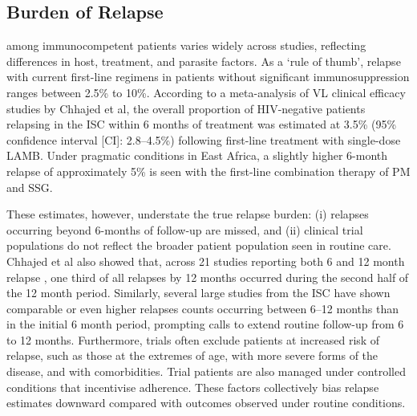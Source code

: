 
\subsection{Burden of Relapse\label{sec:burden-relapse}}

 among immunocompetent patients varies widely across studies, reflecting differences in host, treatment, and parasite factors\cite{chhajed2024}. As a `rule of thumb', relapse  with current first-line regimens in patients without significant immunosuppression ranges between 2.5\% to 10\%\cite{chhajed2024}. According to a meta-analysis of VL clinical efficacy studies by Chhajed et al, the overall proportion of HIV-negative patients relapsing in the ISC within 6 months of treatment was estimated at 3.5\% (95\% confidence interval [CI]: 2.8--4.5\%) following first-line treatment with single-dose LAMB\cite{chhajed2024}. Under pragmatic conditions in East Africa, a slightly higher 6-month relapse  of approximately 5\% is seen with the first-line combination therapy of PM and SSG\cite{kimutai2017,atia2015,melaku2007}.

These estimates, however, understate the true relapse burden: (i) relapses occurring beyond 6-months of follow-up are missed, and (ii) clinical trial populations do not reflect the broader patient population seen in routine care. Chhajed et al also showed that, across 21 studies reporting both 6 and 12 month relapse , one third of all relapses by 12 months occurred during the second half of the 12 month period\cite{chhajed2024}. Similarly, several large studies from the ISC have shown comparable or even higher relapses counts occurring between 6--12 months than in the initial 6 month period, prompting calls to extend routine follow-up from 6 to 12 months\cite{sundar2019,rijal2013,burza2013,burza2014,goyal2019}. Furthermore, trials often exclude patients at increased risk of relapse, such as those at the extremes of age, with more severe forms of the disease, and with comorbidities. Trial patients are also managed under controlled conditions that incentivise adherence. These factors collectively bias relapse estimates downward compared with outcomes observed under routine conditions.


